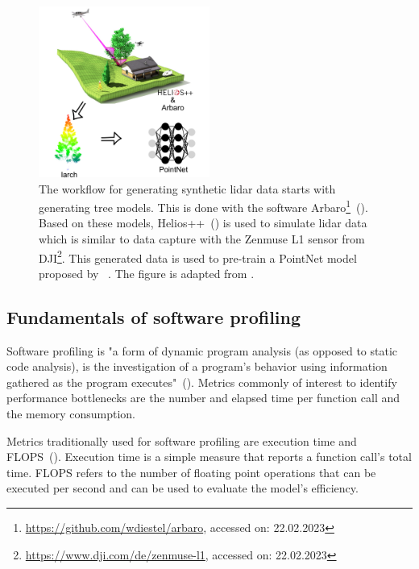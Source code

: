 \documentclass[12pt, a4paper, hidelinks]{article}
\begin{document}
\begin{figure}[H]
\centering
\includegraphics[width=0.5\textwidth]{assets/workflow_synthetic_data}
\caption[Workflow for generating synthetic lidar data ]{The workflow for generating synthetic \ac{lidar} data starts with generating tree models. This is done with the software Arbaro\footnote{\url{https://github.com/wdiestel/arbaro}, accessed on: 22.02.2023}~(\cite{weber_1995_arbaro}). Based on these models, Helios++~(\cite{9906068}) is used to simulate \ac{lidar} data which is similar to data capture with the Zenmuse L1 sensor from DJI\footnote{\url{https://www.dji.com/de/zenmuse-l1}, accessed on: 22.02.2023}. This generated data is used to pre-train a PointNet model proposed by ~\textcite{2017_qi_pointnet}. The figure is adapted from \textcite{9906068}.}
\label{fig:lidar-workflow}
\end{figure}

\subsection{Fundamentals of software profiling}
\label{sec:profiling}

Software profiling is "a form of dynamic program analysis (as opposed to static code analysis), is the investigation of a program's behavior using information gathered as the program executes"~(\cite{wiki:profiling}).
Metrics commonly of interest to identify performance bottlenecks are the number and elapsed time per function call and the memory consumption.

Metrics traditionally used for software profiling are execution time and \acf{FLOPS}~().
Execution time is a simple measure that reports a function call's total time.
\ac{FLOPS} refers to the number of floating point operations that can be executed per second and can be used to evaluate the model's efficiency.
\end{document}
